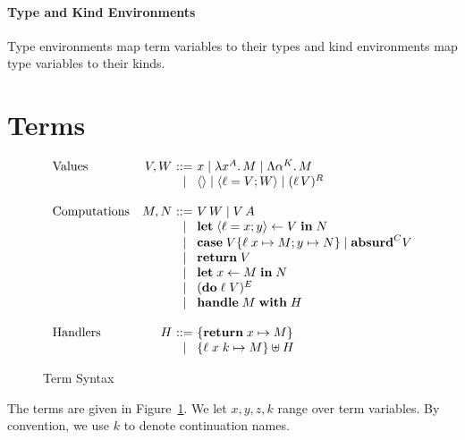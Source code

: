 \documentclass[mscres,cdtppar,twoside,openright,logo,rightchapter,normalheadings]{infthesis}
\makeatletter
\theoremstyle{definition}
\newcommand{\slab}[1]{\textrm{#1}}
\newcommand{\revto}{\ensuremath{\leftarrow}}
\newcommand{\keyw}[1]{\textbf{#1}}
\newcommand{\Handle}{\keyw{handle}}
\newcommand{\With}{\keyw{with}}
\newcommand{\Let}{\keyw{let}}
\newcommand{\In}{\keyw{in}}
\newcommand{\Do}{\keyw{do}}
\newcommand{\Return}{\keyw{return}}
\newcommand{\Case}{\keyw{case}}
\newcommand{\Absurd}{\keyw{absurd}}
\newcommand{\Record}[1]{\ensuremath{\langle #1 \rangle}}
\newcommand{\True}{\mathsf{true}}
\newcommand{\False}{\mathsf{false}}
\newcommand{\ba}{\begin{array}}
\newcommand{\ea}{\end{array}}
\newenvironment{syntax}{\[\ba{@{}l@{\quad}r@{~}c@{~}l@{}}}{\ea\]\ignorespacesafterend}
\makeatother
\begin{document}
\paragraph{Type and Kind Environments}
Type environments map term variables to their types and kind
environments map type variables to their kinds.

\section{Terms}
\begin{figure}
\begin{syntax}
\slab{Values}        &V,W  &::= & x
                             \mid \lambda x^A .\, M \mid \Lambda \alpha^K .\, M  \\
                     &     &\mid& \Record{} \mid \Record{\ell = V;W} \mid (\ell\, V)^R \\
                     &     &    &\\
\slab{Computations}  &M,N  &::= & V\,W \mid V\,A\\
                     &     &\mid& \Let\; \Record{\ell=x;y} \revto V \; \In \; N\\
                     &     &\mid& \Case\; V \{\ell\; x \mapsto M; y \mapsto N\} \mid \Absurd^C V\\
                     &     &\mid& \Return\; V \\
                     &     &\mid& \Let \; x \revto M \; \In \; N\\
                     &     &\mid& (\Do \; \ell \; V)^E \\
                     &     &\mid& \Handle \; M \; \With \; H\\
                     &     &    &\\
\slab{Handlers}      &H    &::= & \{ \Return \; x \mapsto M \} \\
                     &     &\mid& \{ \ell \; x \; k \mapsto M \} \uplus H \\
\end{syntax}

\caption{Term Syntax}
\label{fig:term-syntax}
\end{figure}
The terms are given in Figure~\ref{fig:term-syntax}. We let $x,y,z,k$
range over term variables. By convention, we use $k$ to denote
continuation names. %
\end{document}
